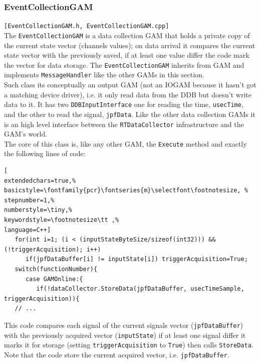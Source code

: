 \subsubsection{EventCollectionGAM}
\texttt{[EventCollectionGAM.h, EventCollectionGAM.cpp]}\\
The \texttt{EventCollectionGAM} is a data collection GAM that holds a private copy of the current state vector (channels values); on data arrival it compares the current state vector with the previously saved, if at least one value differ the code mark the vector for data storage. The \texttt{EventCollectionGAM} inherits from GAM and implements \texttt{MessageHandler} like the other GAMs in this section. \\


Such class its conceptually an output GAM (not an IOGAM because it hasn't got a matching device driver), i.e. it only read data from the DDB but doesn't write data to it. It has two \texttt{DDBInputInterface} one for reading the time, \texttt{usecTime}, and the other to read the signal, \texttt{jpfData}. Like the other data collection GAMs it is an high level interface between the \texttt{RTDataCollector} infrastructure and the GAM's world. \\


The core of this class is, like any other GAM, the \texttt{Execute} method and exactly the following lines of code:
\begin{lstlisting}[
extendedchars=true,%
basicstyle=\fontfamily{pcr}\fontseries{m}\selectfont\footnotesize, %
stepnumber=1,%
numberstyle=\tiny,%
keywordstyle=\footnotesize\tt ,%
language=C++]
   for(int i=1; (i < (inputStateByteSize/sizeof(int32))) && (!triggerAcquisition); i++)
      if(jpfDataBuffer[i] != inputState[i]) triggerAcquisition=True;
   switch(functionNumber){
      case GAMOnline:{
         if(!dataCollector.StoreData(jpfDataBuffer, usecTimeSample, triggerAcquisition)){
   // ...
\end{lstlisting} 
This code compares each signal of the current signals vector (\texttt{jpfDataBuffer}) with the previously acquired vector (\texttt{inputState}) if at least one signal differ it marks it for storage (setting \texttt{triggerAcquisition} to \texttt{True}) then calls \texttt{StoreData}. Note that the code store the current acquired vector, i.e. \texttt{jpfDataBuffer}.


